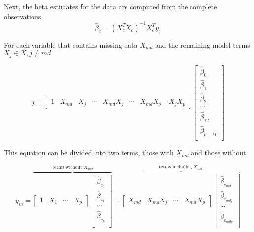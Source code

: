 \documentclass[../../paper.tex]{subfiles}
\begin{document}
Next, the beta estimates for the data are computed from the complete observations.
\begin{equation}
  \hat{\beta}_{c} = (X_{c}^{T}X_{c})^{-1} X_{c}^{T} y_{c}
\end{equation}


For each variable that contains missing data $X_{md}$ and the remaining model
terms $X_{j} \in X, j \neq md$

\begin{equation}
  y =
  \begin{bmatrix}
    1 & X_{md} & X_{j} & \cdots & X_{md}X_{j} & \cdots & X_{md}X_{p} & \cdot X_{j}X_{p}
  \end{bmatrix}
  \begin{bmatrix}
    \hat{\beta}_{0} \\
    \hat{\beta}_{1} \\
    \hat{\beta}_{2} \\
    \cdots \\
    \hat{\beta}_{12} \\
    \hat{\beta}_{p-1 p} \\

  \end{bmatrix}
\end{equation}

This equation can be divided into two terms, those with $X_{md}$ and those without.

\begin{equation}
  y_{m} =
\overbrace{
  \begin{bmatrix}
    1 & X_{1} & \cdots & X_{p}
  \end{bmatrix}
  \begin{bmatrix}
    \hat{\beta}_{c_0} \\
    \hat{\beta}_{c_1} \\
    \cdots \\
    \hat{\beta}_{c_p} \\
  \end{bmatrix}}^{\text{terms without } X_{md}}
   +
  \overbrace{
  \begin{bmatrix}
    X_{md} & X_{md}X_{j} & \cdots & X_{md}X_{p}
  \end{bmatrix}
  \begin{bmatrix}
    \hat{\beta}_{c_{md}} \\
    \hat{\beta}_{c_{mdj}} \\
    \cdots \\
    \hat{\beta}_{c_{mdp}} \\
  \end{bmatrix}}^{\text{terms including } X_{md}}
\end{equation}
\end{document}
